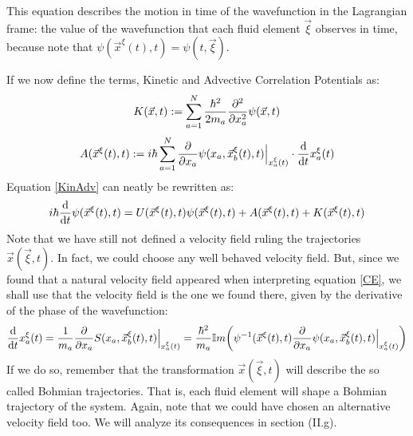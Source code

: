 \documentclass[11pt, a4paper]{article} %
\begin{document}
This equation describes the motion in time of the wavefunction in the Lagrangian frame: the value of the wavefunction that each fluid element $\vec{\xi}$ observes in time, because note that $\psi(\vec{x}^\xi(t),t)=\psi(t, \vec{\xi})$.

If we now define the terms, Kinetic and Advective Correlation Potentials as:\vspace{-0.1cm}
\begin{equation}\label{Kin}
K(\vec{x},t):=\sum_{a=1}^N \frac{\hbar^2}{2m_a}\pdv[2]{}{x_a}\psi(\vec{x},t)
\end{equation}\vspace{-0.1cm}
\begin{equation}\label{Adv}
A(\vec{x}^\xi(t),t):=i\hbar \sum_{a=1}^N \pdv{}{x_a}\psi(x_a,\vec{x}_b^\xi(t), t)\Big\rvert_{x^\xi_a(t)}\cdot \dv{}{t}x^\xi_a(t)
\end{equation}
Equation \eqref{KinAdv} can neatly be rewritten as:\vspace{-0.1cm}
\begin{equation}
i\hbar \dv{}{t}\psi(\vec{x}^\xi(t),t)=U(\vec{x}^\xi(t),t)\psi(\vec{x}^\xi(t),t)+A(\vec{x}^\xi(t),t)+K(\vec{x}^\xi(t),t)\vspace{-0.1cm}
\end{equation}
Note that we have still not defined a velocity field ruling the trajectories $\vec{x}(\vec{\xi},t)$. In fact, we could choose any well behaved velocity field. But, since we found that a natural velocity field appeared when interpreting equation \eqref{CE}, we shall use that the velocity field is the one we found there, given by the derivative of the phase of the wavefunction:
\begin{equation}\label{ImpBohm}
\dv{}{t}x_a^\xi(t)=\frac{1}{m_a}\pdv{}{x_a}S(x_a, \vec{x}_b^\xi(t),t)\Big\rvert_{x^\xi_a(t)}=\frac{\hbar^2}{m_a}\mathbb{I}m \qty( \psi^{-1}(\vec{x}^\xi(t),t)\pdv{}{x_a}\psi(x_a, \vec{x}_b^\xi(t),t)\Big\rvert_{x^\xi_a(t)})
\end{equation}
 If we do so, remember that the transformation $\vec{x}(\vec{\xi},t)$ will describe the so called Bohmian trajectories. That is, each fluid element will shape a Bohmian trajectory of the system. Again, note that we could have chosen an alternative velocity field too. We will analyze its consequences in section (II.g).
\end{document}
